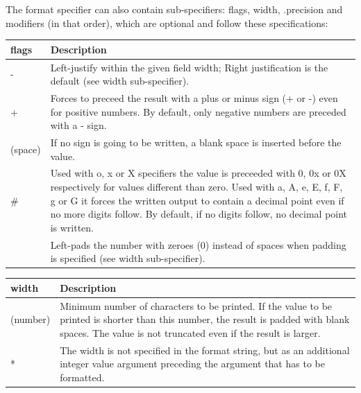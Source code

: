 \documentclass[10pt]{article}
\begin{document}
The format specifier can also contain sub-specifiers: flags, width, .precision
and modifiers (in that order), which are optional and follow these
specifications:

\begin{center}
    \begin{tabularx}{\linewidth}{|*{2}{>{\RaggedRight\arraybackslash}X|}}
        \hline
        \textbf{flags} & \textbf{Description} \\
        \hline
        - & Left-justify within the given field width; Right justification is
            the default (see width sub-specifier). \\
        \hline
        + & Forces to preceed the result with a plus or minus sign (+ or -) even
            for positive numbers. By default, only negative numbers are preceded
            with a - sign. \\
        \hline
        (space) & If no sign is going to be written, a blank space is inserted
                    before the value. \\
        \hline
        \# & Used with o, x or X specifiers the value is preceeded with 0, 0x or
            0X respectively for values different than zero. Used with a, A, e,
            E, f, F, g or G it forces the written output to contain a decimal
            point even if no more digits follow. By default, if no digits
            follow, no decimal point is written. \\
        \hline
        0 & Left-pads the number with zeroes (0) instead of spaces when padding
            is specified (see width sub-specifier). \\
        \hline
    \end{tabularx}
\end{center}

\begin{center}
    \begin{tabularx}{\linewidth}{|*{2}{>{\RaggedRight\arraybackslash}X|}}
        \hline
        \textbf{width} & \textbf{Description} \\
        \hline
        (number) & Minimum number of characters to be printed. If the value to
                    be printed is shorter than this number, the result is padded
                    with blank spaces. The value is not truncated even if the
                    result is larger. \\
        \hline
        * & The width is not specified in the format string, but as an
            additional integer value argument preceding the argument that has to
            be formatted. \\
        \hline
    \end{tabularx}
\end{center}
\end{document}
